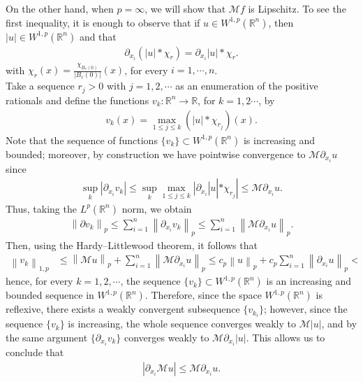 \documentclass[final]{beamer}
\providecommand{\norm}[1]{\left\|#1\right\|}
\newlength{\colwidth}
\begin{document}
\begin{frame}[t]
\begin{columns}[t]
\begin{column}{\colwidth}
  \begin{alertblock}{}
    On the other hand, when $p=\infty$, we will show that $\mathcal{M}f$ is Lipschitz.
    To see the first inequality, it is enough to observe that if $u\in W^{1,p}(\mathbb{R}^{n})$, then $|u|\in W^{1,p}(\mathbb{R}^{n})$ and that
    \begin{align*}
      \partial_{x_i}\left( |u|*\chi_{r} \right)=\partial_{x_i}|u|*\chi_{r}.
    \end{align*}
    with $\chi_{r}(x)=\frac{\chi_{B_{r}(0)}}{|B_{r}(0)|}(x)$, for every $i=1,\cdots,n$.\\
    Take a sequence $r_{j}>0$ with $j=1,2,\cdots$ as an enumeration of the positive rationals and define the functions $v_{k}:\mathbb{R}^{n}\to\mathbb{R}$, for $k=1,2\cdots$, by
    \begin{align*}
      v_{k}(x)=\max_{1\leq j\leq k}\left( |u|*\chi_{r_{j}} \right)(x).
    \end{align*}
    Note that the sequence of functions $\{v_{k}\}\subset W^{1,p}(\mathbb{R}^{n})$ is increasing and bounded; moreover, by construction we have pointwise convergence to $\mathcal{M}\partial_{x_i}u$ since
    \begin{align*}
      \sup_{k}|\partial_{x_i}v_{k}|\leq\sup_{k}\max_{1\leq j\leq k}|\partial_{x_i}|u|*\chi_{r_{j}}|\leq \mathcal{M}\partial_{x_i}u.
    \end{align*}
    Thus, taking the $L^{p}(\mathbb{R}^{n})$ norm, we obtain
    \begin{align*}
      \norm{\partial v_{k}}_{p}\leq\sum_{i=1}^{n}\norm{\partial_{x_{i}}v_k}_{p}\leq\sum_{i=1}^{n}\norm{\mathcal{M}\partial_{x_i} u}_{p}.
    \end{align*}
    Then, using the Hardy–Littlewood theorem, it follows that
    \begin{align*}
      \norm{v_k}_{1,p}&\leq \norm{\mathcal{M}u}_{p}+\sum_{i=1}^{n}\norm{\mathcal{M}\partial_{x_{i}}u}_{p}\leq c_p\norm{u}_{p}+c_{p}\sum_{i=1}^{n}\norm{\partial_{x_{i}}u}_{p}<\infty,
    \end{align*}
    hence, for every $k=1,2,\cdots$, the sequence $\{v_{k}\}\subset W^{1,p}(\mathbb{R}^{n})$ is an increasing and bounded sequence in $W^{1,p}(\mathbb{R}^{n})$. Therefore, since the space $W^{1,p}(\mathbb{R}^{n})$ is reflexive, there exists a weakly convergent subsequence $\{v_{k_{i}}\}$; however, since the sequence $\{v_{k}\}$ is increasing, the whole sequence converges weakly to $\mathcal{M}|u|$, and by the same argument $\{\partial_{x_{i}}v_{k}\}$ converges weakly to $\mathcal{M}\partial_{x_i}|u|$. This allows us to conclude that
    \begin{align*}
      |\partial_{x_i}\mathcal{M}u|\leq \mathcal{M}\partial_{x_i}u.
    \end{align*}


\end{alertblock}
\end{column}
\end{columns}
\end{frame}
\end{document}
